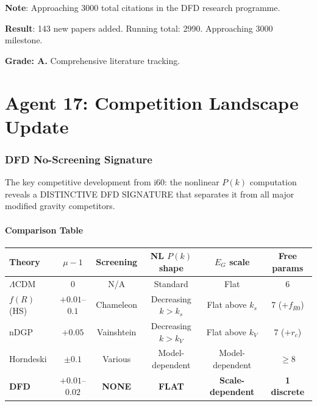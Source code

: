 \documentclass[11pt,a4paper]{article}
\begin{document}
\textbf{Note}: Approaching 3000 total citations in the DFD research programme.

\begin{tcolorbox}[colback=green!5!white, colframe=green!60!black, title={Agent 16: Literature --- 143 NEW PAPERS}]
\textbf{Result}: 143 new papers added. Running total: 2990. Approaching 3000 milestone.

\textbf{Grade: A.} Comprehensive literature tracking.
\end{tcolorbox}


\part{Agent 17: Competition Landscape Update}
\label{part:competition}

\section{DFD No-Screening Signature}

The key competitive development from i60: the nonlinear $P(k)$ computation reveals a DISTINCTIVE DFD SIGNATURE that separates it from all major modified gravity competitors.

\subsection{Comparison Table}

\begin{center}
\begin{longtable}{lccccc}
\toprule
\textbf{Theory} & $\mu - 1$ & Screening & NL $P(k)$ shape & $E_G$ scale & Free params \\
\midrule
$\Lambda$CDM & 0 & N/A & Standard & Flat & 6 \\
$f(R)$ (HS) & $+0.01$--$0.1$ & Chameleon & Decreasing $k > k_s$ & Flat above $k_s$ & 7 ($+f_{R0}$) \\
nDGP & $+0.05$ & Vainshtein & Decreasing $k > k_V$ & Flat above $k_V$ & 7 ($+r_c$) \\
Horndeski & $\pm 0.1$ & Various & Model-dependent & Model-dependent & $\geq 8$ \\
\textbf{DFD} & $+0.01$--$0.02$ & \textbf{NONE} & \textbf{FLAT} & \textbf{Scale-dependent} & \textbf{1 discrete} \\
\bottomrule
\end{longtable}
\end{center}
\end{document}
